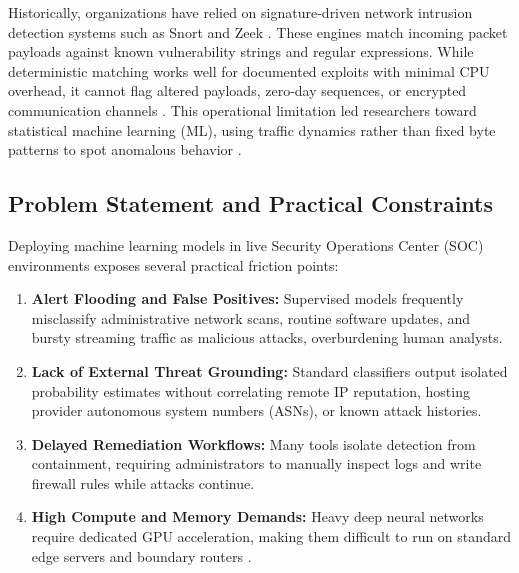 \documentclass[conference]{IEEEtran}
\begin{document}
Historically, organizations have relied on signature-driven network intrusion detection systems such as Snort and Zeek \cite{roesch1999, paxson1999}. These engines match incoming packet payloads against known vulnerability strings and regular expressions. While deterministic matching works well for documented exploits with minimal CPU overhead, it cannot flag altered payloads, zero-day sequences, or encrypted communication channels \cite{axelsson2000}. This operational limitation led researchers toward statistical machine learning (ML), using traffic dynamics rather than fixed byte patterns to spot anomalous behavior \cite{saranya2020}.

\subsection{Problem Statement and Practical Constraints}
Deploying machine learning models in live Security Operations Center (SOC) environments exposes several practical friction points:
\begin{enumerate}
    \item \textbf{Alert Flooding and False Positives:} Supervised models frequently misclassify administrative network scans, routine software updates, and bursty streaming traffic as malicious attacks, overburdening human analysts.
    \item \textbf{Lack of External Threat Grounding:} Standard classifiers output isolated probability estimates without correlating remote IP reputation, hosting provider autonomous system numbers (ASNs), or known attack histories.
    \item \textbf{Delayed Remediation Workflows:} Many tools isolate detection from containment, requiring administrators to manually inspect logs and write firewall rules while attacks continue.
    \item \textbf{High Compute and Memory Demands:} Heavy deep neural networks require dedicated GPU acceleration, making them difficult to run on standard edge servers and boundary routers \cite{pedregosa2011}.
\end{enumerate}
\end{document}
